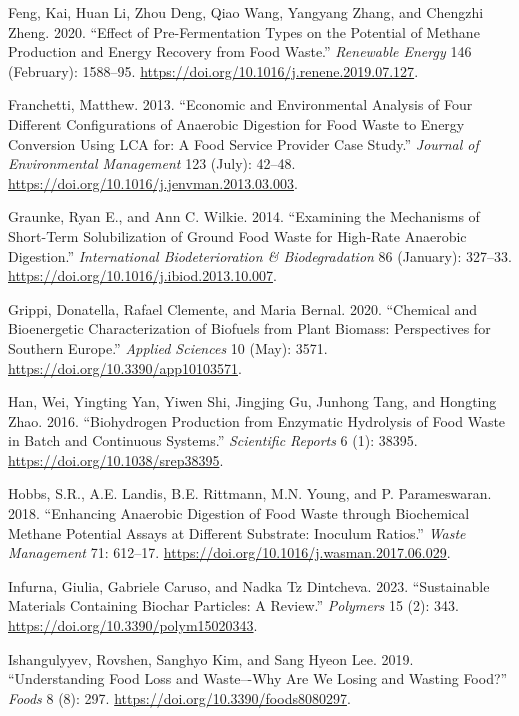 \documentclass[11pt]{report}
\begin{document}
\begin{hangparas}{1.5em}{1}
\hypertarget{citeproc_bib_item_24}{Feng, Kai, Huan Li, Zhou Deng, Qiao Wang, Yangyang Zhang, and Chengzhi Zheng. 2020. “Effect of Pre-Fermentation Types on the Potential of Methane Production and Energy Recovery from Food Waste.” \textit{Renewable Energy} 146 (February): 1588–95. \url{https://doi.org/10.1016/j.renene.2019.07.127}.}

\hypertarget{citeproc_bib_item_25}{Franchetti, Matthew. 2013. “Economic and Environmental Analysis of Four Different Configurations of Anaerobic Digestion for Food Waste to Energy Conversion Using LCA for: A Food Service Provider Case Study.” \textit{Journal of Environmental Management} 123 (July): 42–48. \url{https://doi.org/10.1016/j.jenvman.2013.03.003}.}

\hypertarget{citeproc_bib_item_26}{Graunke, Ryan E., and Ann C. Wilkie. 2014. “Examining the Mechanisms of Short-Term Solubilization of Ground Food Waste for High-Rate Anaerobic Digestion.” \textit{International Biodeterioration \& Biodegradation} 86 (January): 327–33. \url{https://doi.org/10.1016/j.ibiod.2013.10.007}.}

\hypertarget{citeproc_bib_item_27}{Grippi, Donatella, Rafael Clemente, and Maria Bernal. 2020. “Chemical and Bioenergetic Characterization of Biofuels from Plant Biomass: Perspectives for Southern Europe.” \textit{Applied Sciences} 10 (May): 3571. \url{https://doi.org/10.3390/app10103571}.}

\hypertarget{citeproc_bib_item_28}{Han, Wei, Yingting Yan, Yiwen Shi, Jingjing Gu, Junhong Tang, and Hongting Zhao. 2016. “Biohydrogen Production from Enzymatic Hydrolysis of Food Waste in Batch and Continuous Systems.” \textit{Scientific Reports} 6 (1): 38395. \url{https://doi.org/10.1038/srep38395}.}

\hypertarget{citeproc_bib_item_29}{Hobbs, S.R., A.E. Landis, B.E. Rittmann, M.N. Young, and P. Parameswaran. 2018. “Enhancing Anaerobic Digestion of Food Waste through Biochemical Methane Potential Assays at Different Substrate: Inoculum Ratios.” \textit{Waste Management} 71: 612–17. \url{https://doi.org/10.1016/j.wasman.2017.06.029}.}

\hypertarget{citeproc_bib_item_30}{Infurna, Giulia, Gabriele Caruso, and Nadka Tz Dintcheva. 2023. “Sustainable Materials Containing Biochar Particles: A Review.” \textit{Polymers} 15 (2): 343. \url{https://doi.org/10.3390/polym15020343}.}

\hypertarget{citeproc_bib_item_31}{Ishangulyyev, Rovshen, Sanghyo Kim, and Sang Hyeon Lee. 2019. “Understanding Food Loss and Waste–-Why Are We Losing and Wasting Food?” \textit{Foods} 8 (8): 297. \url{https://doi.org/10.3390/foods8080297}.}


\end{hangparas}
\end{document}
